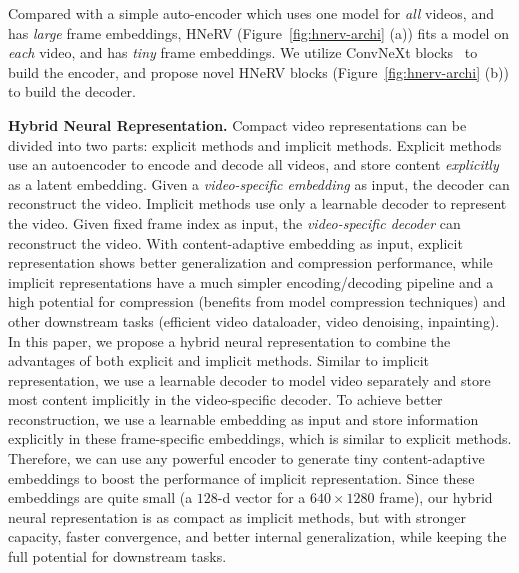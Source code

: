 \documentclass[10pt,twocolumn,letterpaper]{article}
\begin{document}
Compared with a simple auto-encoder which uses one model for \textit{all} videos, and has \textit{large} frame embeddings, HNeRV (Figure~\ref{fig:hnerv-archi} (a)) fits a model on \textit{each} video, and has \textit{tiny} frame embeddings. 
We utilize ConvNeXt blocks~\cite{liu2022convnet} to build the encoder, and propose novel HNeRV blocks (Figure~\ref{fig:hnerv-archi} (b)) to build the decoder.

\noindent\textbf{Hybrid Neural Representation.} 
Compact video representations can be divided into two parts: explicit methods and implicit methods.
Explicit methods use an autoencoder to encode and decode all videos, and store content \textit{explicitly} as a latent embedding.
Given a \textit{video-specific embedding} as input, the decoder can reconstruct the video.
Implicit methods use only a learnable decoder to represent the video.
Given fixed frame index as input, the \textit{video-specific decoder} can reconstruct the video.
With content-adaptive embedding as input, explicit representation shows better generalization and compression performance, while implicit representations have a much simpler encoding/decoding pipeline and a high potential for compression (benefits from model compression techniques) and other downstream tasks (\eg efficient video dataloader, video denoising, inpainting).
In this paper, we propose a hybrid neural representation to combine the advantages of both explicit and implicit methods.
Similar to implicit representation, we use a learnable decoder to model video separately and store most content implicitly in the video-specific decoder.
To achieve better reconstruction, we use a learnable embedding as input and store information explicitly in these frame-specific embeddings, which is similar to explicit methods.
Therefore, we can use any powerful encoder to generate tiny content-adaptive embeddings to boost the performance of implicit representation.
Since these embeddings are quite small (\eg a $128$-d vector for a $640\times1280$ frame), our hybrid neural representation is as compact as implicit methods, but with stronger capacity, faster convergence, and better internal generalization, while keeping the full potential for downstream tasks.
\end{document}
